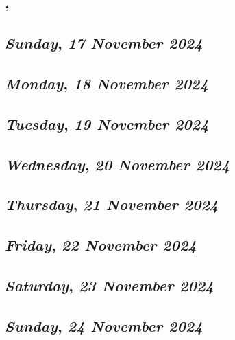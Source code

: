 \subsection*{\weekday, \day}

\def\day{\textit{17 November 2024}}
\def\weekday{\textit{Sunday}}
\subsection*{\weekday, \day}

\def\day{\textit{18 November 2024}}
\def\weekday{\textit{Monday}}
\subsection*{\weekday, \day}

\def\day{\textit{19 November 2024}}
\def\weekday{\textit{Tuesday}}
\subsection*{\weekday, \day}

\def\day{\textit{20 November 2024}}
\def\weekday{\textit{Wednesday}}
\subsection*{\weekday, \day}

\def\day{\textit{21 November 2024}}
\def\weekday{\textit{Thursday}}
\subsection*{\weekday, \day}

\def\day{\textit{22 November 2024}}
\def\weekday{\textit{Friday}}
\subsection*{\weekday, \day}

\def\day{\textit{23 November 2024}}
\def\weekday{\textit{Saturday}}
\subsection*{\weekday, \day}

\def\day{\textit{24 November 2024}}
\def\weekday{\textit{Sunday}}
\subsection*{\weekday, \day}


